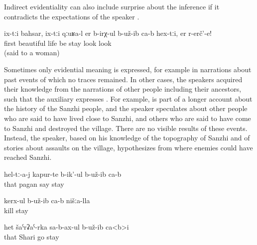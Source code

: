 Indirect evidentiality can also include surprise about the inference if it contradicts the expectations of the speaker .
%
\begin{exe}
	\ex	\label{ex:(It turned out) they lived well first, look@15}
	\gll	ix-tːi	bahsar,	ix-tːi	qːuʁa-l	er b-irχ-ul	b-už-ib ca-b	hex-tːi,	er	r-erč'-e!\\
			first		beautiful	life be	stay 		look	look\\
	\glt	{} (said to a woman)
\end{exe}

Sometimes only evidential meaning is expressed, for example in narrations about past events of which no traces remained. In other cases, the speakers acquired their knowledge from the narrations of other people including their ancestors, such that the auxiliary expresses . For example,  is part of a longer account about the history of the Sanzhi people, and the speaker speculates about other people who are said to have lived close to Sanzhi, and others who are said to have come to Sanzhi and destroyed the village. There are no visible results of these events. Instead, the speaker, based on his knowledge of the topography of Sanzhi and of stories about assaults on the village, hypothesizes from where enemies could have reached Sanzhi.
%
\begin{exe}
	\ex	\label{ex:pagans invaded from Shari}
	\begin{xlist}
		\ex	\label{ex:They were (apparently) called pagans}
		\gll	hel-tː-a-j	kapur-te	b-ik'-ul	b-už-ib	ca-b\\
			that	pagan	say	stay	\\
		\glt	{}
	
		\ex	\label{ex:They apparently killed our (people)}
		\gll	kerx-ul	b-už-ib	ca-b		nišːa-lla\\
			kill	stay			\\
		\glt	{}
	
		\ex	\label{ex:They came from Shari (to us)@16}
		\gll	het	šaˁrʡaˁ-rka	sa-b-ax-ul	b-už-ib ca<b>i\\
			that	Shari	go	stay \\
		\glt	{}
	\end{xlist}
\end{exe}

